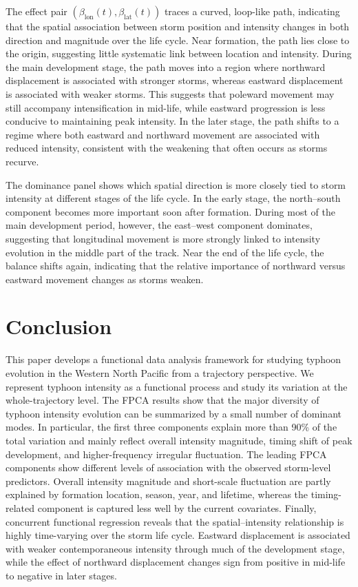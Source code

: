 \documentclass{article}
\begin{document}
The effect pair $(\beta_{\text{lon}}(t),\beta_{\text{lat}}(t))$ traces a curved, loop-like path, indicating that the spatial association between storm position and intensity changes in both direction and magnitude over the life cycle. Near formation, the path lies close to the origin, suggesting little systematic link between location and intensity. During the main development stage, the path moves into a region where northward displacement is associated with stronger storms, whereas eastward displacement is associated with weaker storms. This suggests that poleward movement may still accompany intensification in mid-life, while eastward progression is less conducive to maintaining peak intensity. In the later stage, the path shifts to a regime where both eastward and northward movement are associated with reduced intensity, consistent with the weakening that often occurs as storms recurve.

The dominance panel shows which spatial direction is more closely tied to storm intensity at different stages of the life cycle. In the early stage, the north--south component becomes more important soon after formation. During most of the main development period, however, the east--west component dominates, suggesting that longitudinal movement is more strongly linked to intensity evolution in the middle part of the track. Near the end of the life cycle, the balance shifts again, indicating that the relative importance of northward versus eastward movement changes as storms weaken.

\section{Conclusion}
This paper develops a functional data analysis framework for studying typhoon evolution in the Western North Pacific from a trajectory perspective. We represent typhoon intensity as a functional process and study its variation at the whole-trajectory level. The FPCA results show that the major diversity of typhoon intensity evolution can be summarized by a small number of dominant modes. In particular, the first three components explain more than 90\% of the total variation and mainly reflect overall intensity magnitude, timing shift of peak development, and higher-frequency irregular fluctuation. The leading FPCA components show different levels of association with the observed storm-level predictors. Overall intensity magnitude and short-scale fluctuation are partly explained by formation location, season, year, and lifetime, whereas the timing-related component is captured less well by the current covariates. Finally, concurrent functional regression reveals that the spatial--intensity relationship is highly time-varying over the storm life cycle. Eastward displacement is associated with weaker contemporaneous intensity through much of the development stage, while the effect of northward displacement changes sign from positive in mid-life to negative in later stages.
\end{document}
